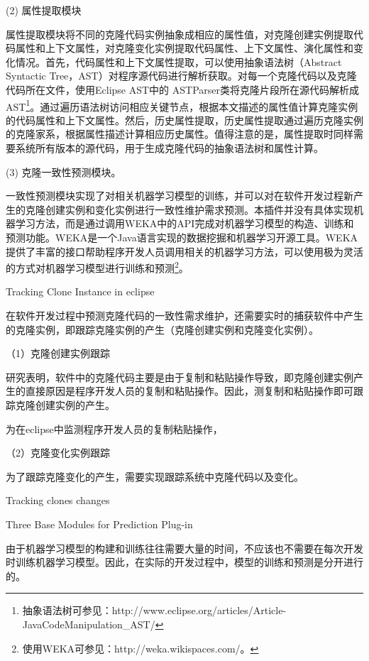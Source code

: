 {(2) 属性提取模块

属性提取模块将不同的克隆代码实例抽象成相应的属性值，对克隆创建实例提取代码属性和上下文属性，对克隆变化实例提取代码属性、上下文属性、演化属性和变化情况。首先，代码属性和上下文属性提取，可以使用抽象语法树（Abstract Syntactic Tree，AST）对程序源代码进行解析获取。对每一个克隆代码以及克隆代码所在文件，使用Eclipse AST中的 ASTParser类将克隆片段所在源代码解析成AST\footnote{抽象语法树可参见：http://www.eclipse.org/articles/Article-JavaCodeManipulation\_AST/}。通过遍历语法树访问相应关键节点，根据本文描述的属性值计算克隆实例的代码属性和上下文属性。然后，历史属性提取，历史属性提取通过遍历克隆实例的克隆家系，根据属性描述计算相应历史属性。值得注意的是，属性提取时同样需要系统所有版本的源代码，用于生成克隆代码的抽象语法树和属性计算。%


(3) 克隆一致性预测模块。

一致性预测模块实现了对相关机器学习模型的训练，并可以对在软件开发过程新产生的克隆创建实例和变化实例进行一致性维护需求预测。本插件并没有具体实现机器学习方法，而是通过调用WEKA中的API完成对机器学习模型的构造、训练和预测功能。WEKA是一个Java语言实现的数据挖掘和机器学习开源工具。WEKA提供了丰富的接口帮助程序开发人员调用相关的机器学习方法，可以使用极为灵活的方式对机器学习模型进行训练和预测\footnote{使用WEKA可参见：http://weka.wikispaces.com/。}。


{Tracking Clone Instance in eclipse }

在软件开发过程中预测克隆代码的一致性需求维护，还需要实时的捕获软件中产生的克隆实例，即跟踪克隆实例的产生（克隆创建实例和克隆变化实例）。

（1）克隆创建实例跟踪

研究表明，软件中的克隆代码主要是由于复制和粘贴操作导致，即克隆创建实例产生的直接原因是程序开发人员的复制和粘贴操作。因此，测复制和粘贴操作即可跟踪克隆创建实例的产生。


为在eclipse中监测程序开发人员的复制粘贴操作，


（2）克隆变化实例跟踪

为了跟踪克隆变化的产生，需要实现跟踪系统中克隆代码以及变化。


Tracking clones changes

{Three Base Modules for Prediction Plug-in }

由于机器学习模型的构建和训练往往需要大量的时间，不应该也不需要在每次开发时训练机器学习模型。因此，在实际的开发过程中，模型的训练和预测是分开进行的。

}
